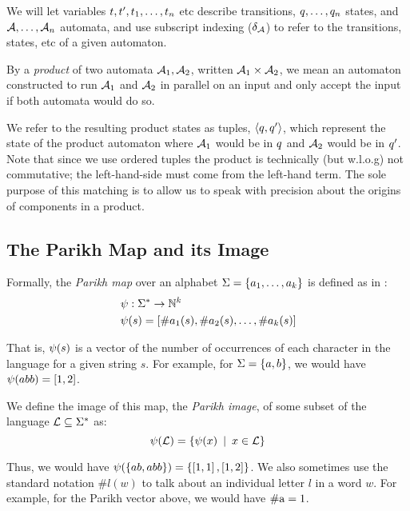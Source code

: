 We will let variables $t, t', t_1, \ldots,
t_n$ etc describe transitions, $q, \ldots, q_n$ states, and
$\mathcal{A}, \ldots, \mathcal{A}_n$ automata, and use subscript indexing
($\delta_{\mathcal{A}}$) to refer to the transitions, states, etc of a given
automaton.

By a \emph{product} of two automata $\mathcal{A}_1, \mathcal{A}_2$, written
$\mathcal{A}_1 \times \mathcal{A}_2$, we mean an automaton constructed to run
$\mathcal{A}_1$ and $\mathcal{A}_2$ in parallel on an input and only accept the
input if both automata would do so.

We refer to the resulting product states as tuples, $\left\langle q, q'\right\rangle$,
which represent the state of the product automaton where $\mathcal{A}_1$ would be
in $q$ and $\mathcal{A}_2$ would be in $q'$. Note that since we use
ordered tuples the product is technically (but w.l.o.g) not commutative; the
left-hand-side must come from the left-hand term. The sole purpose of this
matching is to allow us to speak with precision about the origins of components
in a product.

\subsection{The Parikh Map and its Image}
Formally, the \textit{Parikh map} over an alphabet $\Sigma=
\left\{a_1, \ldots, a_k \right\}$ is defined as in \cite{kozen}:
$$
\begin{aligned}
& \operatorname{\psi}: \Sigma^* \rightarrow \mathbb{N}^k \\
& \operatorname{\psi}(s) = \left[{\#a_1(s), \#a_2(s), \ldots, \#a_k(s)}\right]
\end{aligned}
$$

That is, $\operatorname{\psi}(s)$ is a vector of the number of occurrences of each
character in the language for a given string $s$. For example, for  $\Sigma =
\left\{a, b\right\}$, we would have $\operatorname{\psi}(abb) = \left[{1, 2}\right]$.

We define the image of this map, the \textit{Parikh image}, of some subset of
the language $\operatorname{\mathcal{L}} \subseteq \Sigma^*$ as:
\[
\operatorname{\psi}(\operatorname{\mathcal{L}}) = \left\{\operatorname{\psi}(x) \:\mid\: x \in \operatorname{\mathcal{L}}\right\}
\]

Thus, we would have $\operatorname{\psi}(\left\{ab, abb\right\}) = \left\{\left[1,
1\right], \left[1, 2\right]\right\}$. We also sometimes use the standard
notation $\#l(w)$ to talk about an individual letter $l$ in a word $w$. For
example, for the Parikh vector above, we would have $\#\text{a} = 1$.

